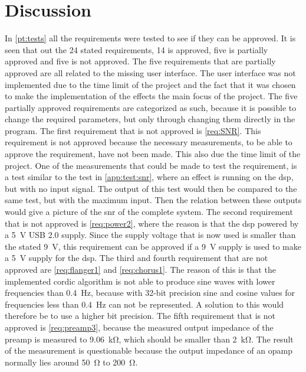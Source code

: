 \section{Discussion}\label{sec:discussion}

In \autoref{pt:tests} all the requirements were tested to see if they can be approved. It is seen that out the 24 stated requirements, 14 is approved, five is partially approved and five is not approved. 
The five requirements that are partially approved are all related to the missing user interface. The user interface was not implemented due to the time limit of the project and the fact that it was chosen to make the implementation of the effects the main focus of the project. The five partially approved requirements are categorized as such, because it is possible to change the required parameters, but only through changing them directly in the program. The first requirement that is not approved is \autoref{req:SNR}. This requirement is not approved because the necessary measurements, to be able to approve the requirement, have not been made. This also due the time limit of the project. One of the measurements that could be made to test the requirement, is a test similar to the test in \autoref{app:test:snr}, where an effect is running on the \gls{dsp}, but with no input signal. The output of this test would then be compared to the same test, but with the maximum input. Then the relation between these outputs would give a picture of the \gls{snr} of the complete system.
The second requirement that is not approved is \autoref{req:power2}, where the reason is that the \gls{dsp} powered by a \SI{5}{\volt} USB 2.0 supply. Since the supply voltage that is now used is smaller than the stated \SI{9}{\volt}, this requirement can be approved if a \SI{9}{\volt} supply is used to make a \SI{5}{\volt} supply for the \gls{dsp}.
The third and fourth requirement that are not approved are \autoref{req:flanger1} and \autoref{req:chorus1}. The reason of this is that the implemented \gls{cordic} algorithm is not able to produce sine waves with lower frequencies than \SI{0.4}{\hertz}, because with 32-bit precision sine and cosine values for frequencies less than \SI{0.4}{\hertz} can not be represented. A solution to this would therefore be to use a higher bit precision.
The fifth requirement that is not approved is \autoref{req:preamp3}, because the measured output impedance of the preamp is measured to \SI{9.06}{\kilo\ohm}, which should be smaller than \SI{2}{\kilo\ohm}. The result of the measurement is questionable because the output impedance of an \gls{opamp} normally lies around \SI{50}{\ohm} to \SI{200}{\ohm}. \\

